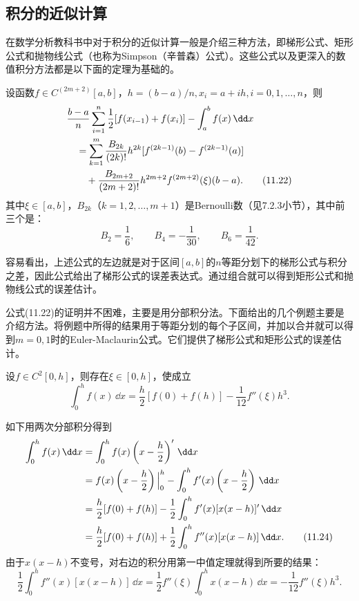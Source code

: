 \subsection{积分的近似计算}

在数学分析教科书中对于积分的近似计算一般是介绍三种方法，即梯形公式、矩形公式和抛物线公式（也称为Simpson（辛普森）公式）。这些公式以及更深入的数值积分方法都是以下面的定理为基础的。

\begin{xproposition}
设函数$f\in C^{(2m+2)}[a,b]$，$h=(b-a)/n,x_i=a+ih,i=0,1,\ldots,n$，则
\begin{align}
&\frac{b-a}{n}\sum_{i=1}^n\frac12[f(x_{i-1})+f(x_i)]-\int_a^bf(x)\,\dd x\notag\\
&\quad=\sum_{k=1}^m\frac{B_{2k}}{(2k)!}h^{2k}[f^{(2k-1)}(b)-f^{(2k-1)}(a)]\notag\\
&\qquad+\frac{B_{2m+2}}{(2m+2)!}h^{2m+2}f^{(2m+2)}(\xi)(b-a).
\tag{11.22}
\label{eq:11.22}
\end{align}
其中$\xi\in[a,b]$，$B_{2k}$（$k=1,2,\ldots,m+1$）是Bernoulli数（见7.2.3小节），其中前三个是：
\[
  B_2=\frac16,\qquad B_4=-\frac1{30},\qquad B_6=\frac1{42}.
\]
\end{xproposition}

容易看出，上述公式的左边就是对于区间$[a,b]$的$n$等距分划下的梯形公式与积分之差，因此公式给出了梯形公式的误差表达式。通过组合就可以得到矩形公式和抛物线公式的误差估计。

公式(11.22)的证明并不困难，主要是用分部积分法。下面给出的几个例题主要是介绍方法。将例题中所得的结果用于等距分划的每个子区间，并加以合并就可以得到$m=0,1$时的Euler-Maclaurin公式。它们提供了梯形公式和矩形公式的误差估计。

\begin{xexample}[11.3.4]
设$f\in C^2[0,h]$，则存在$\xi\in[0,h]$，使成立
\begin{equation}
  \int_0^hf(x)\,\dd x=\frac h2[f(0)+f(h)]-\frac1{12}f''(\xi)h^3.
  \tag{11.23}
  \label{eq:11.23}
\end{equation}
\end{xexample}
\begin{xproof}
如下用两次分部积分得到
\begin{align}
\int_0^hf(x)\,\dd x
&=\int_0^hf(x)\left(x-\frac h2\right)'\,\dd x\notag\\
&=f(x)\left(x-\frac h2\right)\Big|_0^h-\int_0^hf'(x)\left(x-\frac h2\right)\,\dd x\notag\\
&=\frac h2[f(0)+f(h)]-\frac12\int_0^hf'(x)[x(x-h)]'\,\dd x\notag\\
&=\frac h2[f(0)+f(h)]+\frac12\int_0^hf''(x)[x(x-h)]\,\dd x.
\tag{11.24}
\label{eq:11.24}
\end{align}
由于$x(x-h)$不变号，对右边的积分用第一中值定理就得到所要的结果：
\[
  \frac12\int_0^hf''(x)[x(x-h)]\,\dd x
  =\frac12f''(\xi)\int_0^hx(x-h)\,\dd x
  =-\frac1{12}f''(\xi)h^3.
\]
\end{xproof}

